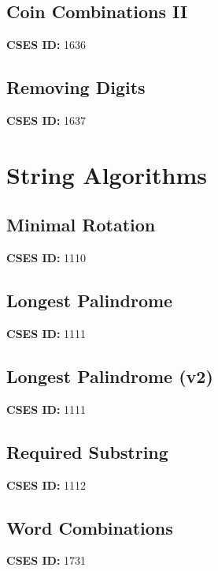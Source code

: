\documentclass[10pt, a4paper, twocolumn, landscape]{article}
\begin{document}
\subsection{Coin Combinations II}
\textbf{CSES ID:} 1636 \\

\vspace{0.2cm}
\subsection{Removing Digits}
\textbf{CSES ID:} 1637 \\

\vspace{0.2cm}
\section{String Algorithms}
\subsection{Minimal Rotation}
\textbf{CSES ID:} 1110 \\

\vspace{0.2cm}
\subsection{Longest Palindrome}
\textbf{CSES ID:} 1111 \\

\vspace{0.2cm}
\subsection{Longest Palindrome (v2)}
\textbf{CSES ID:} 1111 \\

\vspace{0.2cm}
\subsection{Required Substring}
\textbf{CSES ID:} 1112 \\

\vspace{0.2cm}
\subsection{Word Combinations}
\textbf{CSES ID:} 1731 \\

\vspace{0.2cm}
\end{document}
